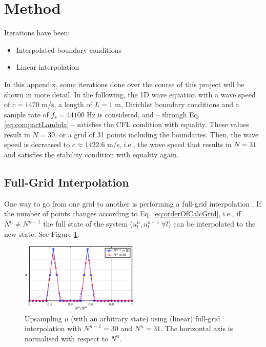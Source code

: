 \section{Method}
Iterations have been:
\begin{itemize}
    \item Interpolated boundary conditions
    \item Linear interpolation
\end{itemize}

 In this appendix, some iterations done over the course of this project will be shown in more detail. In the following, the 1D wave equation with a wave speed of $c = 1470$ m/s, a length of $L = 1$ m, Dirichlet boundary conditions and a sample rate of $f_\text{s} = 44100$ Hz is considered, and -- through Eq. \eqref{eq:compactLambda} -- satisfies the CFL condition with equality. These values result in $N = 30$, or a grid of 31 points including the boundaries. Then, the wave speed is decreased to $c \approx 1422.6$ m/s, i.e., the wave speed that results in $N=31$ and satisfies the stability condition with equality again. 

\subsection{Full-Grid Interpolation}
One way to go from one grid to another is performing a full-grid interpolation \cite[Chap. 5]{theBible}. If the number of points changes according to Eq. \eqref{eq:orderOfCalcGrid}, i.e., if $N^n \neq N^{n-1}$ the full state of the system ($u_l^n, u_l^{n-1}\ \forall l$)  can be interpolated to the new state. See Figure \ref{fig:fullGrid}. 

\begin{figure}[ht]
    \centering

\includegraphics[width=0.5\textwidth]{dynamic/fullGrid.eps}
\caption{\label{fig:fullGrid}{Upsampling $u$ (with an arbitrary state) using (linear) full-grid interpolation with $N^{n-1} = 30$ and $N^n = 31$. The horizontal axis is normalised with respect to $N^n$.}}
\end{figure} 

